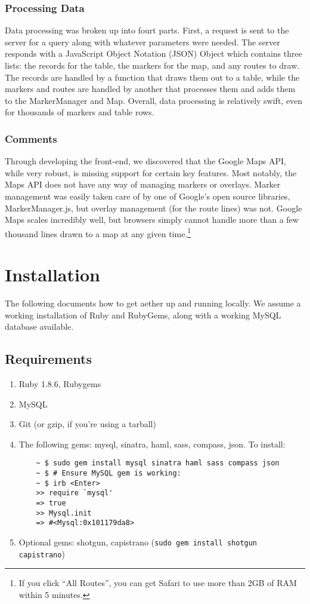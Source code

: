 \documentclass[12pt, letterpaper]{article}
\begin{document}
\subsubsection{Processing Data}
Data processing was broken up into fourt parts. First, a request is sent to the server for a query along with whatever parameters were needed. The server responds with a JavaScript Object Notation (JSON) Object which contains three lists: the records for the table, the markers for the map, and any routes to draw. The records are handled by a function that draws them out to a table, while the markers and routes are handled by another that processes them and adds them to the MarkerManager and Map. Overall, data processing is relatively swift, even for thousands of markers and table rows.

\subsubsection{Comments}
Through developing the front-end, we discovered that the Google Maps API, while very robust, is missing support for certain key features. Most notably, the Maps API does not have any way of managing markers or overlays. Marker management was easily taken care of by one of Google's open source libraries, MarkerManager.js, but overlay management (for the route lines) was not. Google Maps scales incredibly well, but browsers simply cannot handle more than a few thousand lines drawn to a map at any given time.\footnote{If you click ``All Routes'', you can get Safari to use more than 2GB of RAM within 5 minutes.}

\section{Installation}
The following documents how to get aether up and running locally. We assume a working installation of Ruby and RubyGems, along with a working MySQL database available.

\subsection{Requirements}
\begin{enumerate}
  \item Ruby 1.8.6, Rubygems
  \item MySQL
  \item Git (or gzip, if you're using a tarball)
  \item The following gems: mysql, sinatra, haml, sass, compass, json. To install:
  \begin{verbatim}
    ~ $ sudo gem install mysql sinatra haml sass compass json
    ~ $ # Ensure MySQL gem is working:
    ~ $ irb <Enter>
    >> require `mysql'
    => true
    >> Mysql.init
    => #<Mysql:0x101179da8>
  \end{verbatim}
  \item Optional gems: shotgun, capistrano (\verb!sudo gem install shotgun capistrano!)
\end{enumerate}
\end{document}
